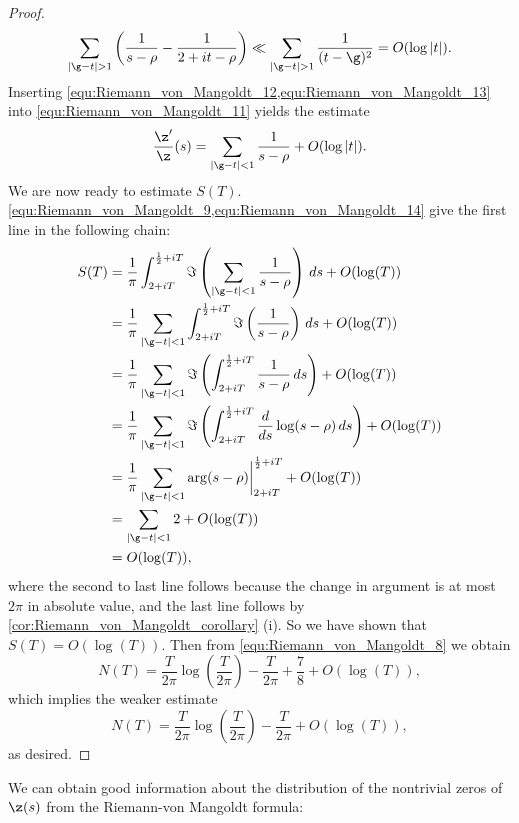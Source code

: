 \begin{proof}
        \begin{equation}\label{equ:Riemann_von_Mangoldt_13}
          \sum_{|\g-t| > 1}\left(\frac{1}{s-\rho}-\frac{1}{2+it-\rho}\right) \ll \sum_{|\g-t| > 1}\frac{1}{(t-\g)^{2}} = O(\log|t|).
        \end{equation}
        Inserting \cref{equ:Riemann_von_Mangoldt_12,equ:Riemann_von_Mangoldt_13} into \cref{equ:Riemann_von_Mangoldt_11} yields the estimate
        \begin{equation}\label{equ:Riemann_von_Mangoldt_14}
          \frac{\z'}{\z}(s) = \sum_{|\g-t| < 1}\frac{1}{s-\rho}+O(\log|t|).
        \end{equation}
        We are now ready to estimate $S(T)$. \cref{equ:Riemann_von_Mangoldt_9,equ:Riemann_von_Mangoldt_14} give the first line in the following chain:
        \begin{align*}
          S(T) &= \frac{1}{\pi}\int_{2+iT}^{\frac{1}{2}+iT}\Im\left(\sum_{|\g-t| < 1}\frac{1}{s-\rho}\right)\,ds+O(\log(T)) \\
          &= \frac{1}{\pi}\sum_{|\g-t| < 1}\int_{2+iT}^{\frac{1}{2}+iT}\Im\left(\frac{1}{s-\rho}\right)\,ds+O(\log(T)) \\
          &= \frac{1}{\pi}\sum_{|\g-t| < 1}\Im\left(\int_{2+iT}^{\frac{1}{2}+iT}\frac{1}{s-\rho}\,ds\right)+O(\log(T)) \\
          &= \frac{1}{\pi}\sum_{|\g-t| < 1}\Im\left(\int_{2+iT}^{\frac{1}{2}+iT}\frac{d}{ds}\log(s-\rho)\,ds\right)+O(\log(T)) \\
          &= \frac{1}{\pi}\sum_{|\g-t| < 1}\arg(s-\rho)\bigg|_{2+iT}^{\frac{1}{2}+iT}+O(\log(T)) \\
          &= \sum_{|\g-t| < 1}2+O(\log(T)) \\
          &= O(\log(T)),
        \end{align*}
        where the second to last line follows because the change in argument is at most $2\pi$ in absolute value, and the last line follows by \cref{cor:Riemann_von_Mangoldt_corollary} (i). So we have shown that $S(T) = O(\log(T))$. Then from \cref{equ:Riemann_von_Mangoldt_8} we obtain
        \[
          N(T) = \frac{T}{2\pi}\log\left(\frac{T}{2\pi}\right)-\frac{T}{2\pi}+\frac{7}{8}+O(\log(T)),
        \]
        which implies the weaker estimate
        \[
          N(T) = \frac{T}{2\pi}\log\left(\frac{T}{2\pi}\right)-\frac{T}{2\pi}+O(\log(T)),
        \]
        as desired.
      \end{proof}

      We can obtain good information about the distribution of the nontrivial zeros of $\z(s)$ from the Riemann-von Mangoldt formula:

